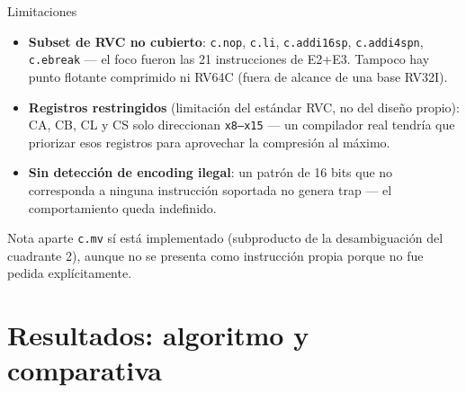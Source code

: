 \documentclass{beamer}
\begin{document}
\begin{frame}{Limitaciones}
  \begin{itemize}
    \item<1-> \textbf{Subset de RVC no cubierto}: \texttt{c.nop},
      \texttt{c.li}, \texttt{c.addi16sp}, \texttt{c.addi4spn},
      \texttt{c.ebreak} --- el foco fueron las 21 instrucciones de E2+E3.
      Tampoco hay punto flotante comprimido ni RV64C (fuera de alcance de una
      base RV32I).
    \item<2-> \textbf{Registros restringidos} (limitación del estándar RVC,
      no del diseño propio): CA, CB, CL y CS solo direccionan
      \texttt{x8--x15} --- un compilador real tendría que priorizar esos
      registros para aprovechar la compresión al máximo.
    \item<3-> \textbf{Sin detección de encoding ilegal}: un patrón de 16 bits
      que no corresponda a ninguna instrucción soportada no genera trap ---
      el comportamiento queda indefinido.
  \end{itemize}
  \vspace{0.2cm}
  \begin{alertblock}{Nota aparte}
    \texttt{c.mv} sí está implementado (subproducto de la desambiguación del
    cuadrante 2), aunque no se presenta como instrucción propia porque no fue
    pedida explícitamente.
  \end{alertblock}
\end{frame}

\section{Resultados: algoritmo y comparativa}
\end{document}
